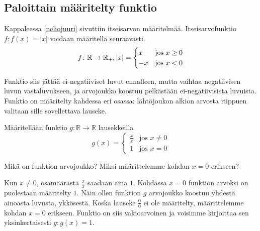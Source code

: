 \subsection*{Paloittain määritelty funktio}

Kappaleessa \ref{neliojuuri} sivuttiin itseisarvon määritelmää. Itseisarvofunktio $f: f(x) = \lvert x \rvert$ voidaan määritellä seuraavasti. \\ 
$$
f\colon \mathbb{R} \to \mathbb{R_+}, \\ \lvert x \rvert = \begin{cases}
                 x & \text{jos } x \geq 0 \\
                 -x & \text{jos } x < 0
              
                \end{cases}
$$

Funktio siis jättää ei-negatiiviset luvut ennalleen, mutta vaihtaa negatiivisen luvun vastaluvukseen, ja arvojoukko koostuu pelkästään ei-negatiivisista luvuista. Funktio on määritelty kahdessa eri osassa: lähtöjoukon alkion arvosta riippuen valitaan sille sovellettava lauseke.

\begin{esimerkki}
 
 Määritellään funktio $g\colon \mathbb{R} \to \mathbb{R}$ lausekkeilla
 $$
 g(x) = \begin{cases}
         \frac{x}{x} & \text{jos } x \neq 0 \\
         1 & \text{jos } x = 0
        \end{cases}
$$
 
Mikä on funktion arvojoukko? Miksi määrittelemme kohdan $x = 0$ erikseen?

\begin{esimratk}
Kun $x \neq 0$, osamäärästä $\frac{x}{x}$ saadaan aina $1$. Kohdassa $x=0$ funktion arvoksi on puolestaan määritelty $1$. Näin ollen funktion $g$ arvojoukko koostuu yhdestä ainoasta luvusta, ykkösestä. Koska lauseke $\frac{0}{0}$ ei ole määritelty, määrittelemme kohdan $x=0$ erikseen. Funktio on siis vakioarvoinen ja voisimme kirjoittaa sen yksinkertaisesti $g\colon g(x) = 1$. 

\end{esimratk}

 
\end{esimerkki}

	


